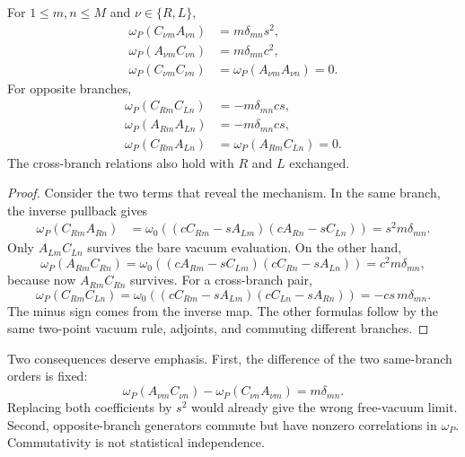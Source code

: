 \begin{theorem}
\label{thm:ch19-mode-same-branch}
\label{thm:ch19-mode-cross-branch}
For $1\leq m,n\leq M$ and $\nu\in\{R,L\}$,
\begin{align}
 \omega_P(C_{\nu m}A_{\nu n})
   &=m\delta_{mn}s^2,
   \label{eq:ch19-mode-CA}\\
 \omega_P(A_{\nu m}C_{\nu n})
   &=m\delta_{mn}c^2,
   \label{eq:ch19-mode-AC}\\
 \omega_P(C_{\nu m}C_{\nu n})
   &=\omega_P(A_{\nu m}A_{\nu n})=0.
   \label{eq:ch19-mode-like}
\end{align}
For opposite branches,
\begin{align}
 \omega_P(C_{Rm}C_{Ln})
   &=-m\delta_{mn}cs,
   \label{eq:ch19-cross-CC}\\
 \omega_P(A_{Rm}A_{Ln})
   &=-m\delta_{mn}cs,
   \label{eq:ch19-cross-AA}\\
 \omega_P(C_{Rm}A_{Ln})
   &=\omega_P(A_{Rm}C_{Ln})=0.
   \label{eq:ch19-cross-mixed}
\end{align}
The cross-branch relations also hold with $R$ and $L$ exchanged.
\end{theorem}
\begin{proof}
Consider the two terms that reveal the mechanism.  In the same
branch, the inverse pullback gives
\begin{align*}
 \omega_P(C_{Rm}A_{Rn})
 &=\omega_0\!\left((cC_{Rm}-sA_{Lm})
                    (cA_{Rn}-sC_{Ln})\right)
 =s^2m\delta_{mn}.
\end{align*}
Only $A_{Lm}C_{Ln}$ survives the bare vacuum evaluation.  On the
other hand,
\[
 \omega_P(A_{Rm}C_{Rn})
 =\omega_0\!\left((cA_{Rm}-sC_{Lm})
                     (cC_{Rn}-sA_{Ln})\right)
 =c^2m\delta_{mn},
\]
because now $A_{Rm}C_{Rn}$ survives.  For a cross-branch pair,
\[
 \omega_P(C_{Rm}C_{Ln})
 =\omega_0\!\left((cC_{Rm}-sA_{Lm})
                     (cC_{Ln}-sA_{Rn})\right)
 =-cs\,m\delta_{mn}.
\]
The minus sign comes from the inverse map.  The other formulas
follow by the same two-point vacuum rule, adjoints, and commuting
different branches.
\end{proof}

Two consequences deserve emphasis.  First, the difference of the two
same-branch orders is fixed:
\begin{equation}
 \omega_P(A_{\nu m}C_{\nu n})
 -\omega_P(C_{\nu n}A_{\nu m})
 =m\delta_{mn}.
 \label{eq:ch19-mode-commutator-check}
\end{equation}
Replacing both coefficients by $s^2$ would already give the wrong
free-vacuum limit.  Second, opposite-branch generators commute but
have nonzero correlations in $\omega_P$.  Commutativity is not
statistical independence.

